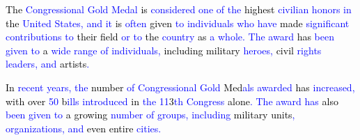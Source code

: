 \begin{tcolorbox}
    \textcolor{black}{The} \textcolor{blue}{Cong}\textcolor{blue}{r}\textcolor{blue}{essional} \textcolor{blue}{Gold} \textcolor{blue}{Medal} \textcolor{black}{is} \textcolor{blue}{considered} \textcolor{blue}{one} \textcolor{blue}{of} \textcolor{blue}{the} \textcolor{black}{highest} \textcolor{blue}{civil}\textcolor{blue}{ian} \textcolor{blue}{hon}\textcolor{blue}{ors} \textcolor{blue}{in} \textcolor{black}{the} \textcolor{blue}{United} \textcolor{blue}{States}\textcolor{blue}{,} \textcolor{blue}{and} \textcolor{blue}{it} \textcolor{black}{is} \textcolor{blue}{often} \textcolor{black}{given} \textcolor{blue}{to} \textcolor{blue}{individuals} \textcolor{blue}{who} \textcolor{blue}{have} \textcolor{black}{made} \textcolor{blue}{significant} \textcolor{blue}{contributions} \textcolor{blue}{to} \textcolor{black}{their} \textcolor{black}{field} \textcolor{blue}{or} \textcolor{blue}{to} \textcolor{black}{the} \textcolor{blue}{country} \textcolor{black}{as} \textcolor{blue}{a} \textcolor{blue}{whole}\textcolor{blue}{.} \textcolor{blue}{The} \textcolor{blue}{award} \textcolor{black}{has} \textcolor{blue}{been} \textcolor{blue}{given} \textcolor{blue}{to} \textcolor{black}{a} \textcolor{blue}{wide} \textcolor{blue}{range} \textcolor{blue}{of} \textcolor{blue}{individuals}\textcolor{blue}{,} \textcolor{black}{including} \textcolor{black}{military} \textcolor{blue}{hero}\textcolor{blue}{es}\textcolor{blue}{,} \textcolor{black}{civil} \textcolor{blue}{rights} \textcolor{blue}{leaders}\textcolor{blue}{,} \textcolor{blue}{and} \textcolor{black}{artists}\textcolor{blue}{.}
    
    \textcolor{black}{In} \textcolor{blue}{recent} \textcolor{blue}{years}\textcolor{blue}{,} \textcolor{blue}{the} \textcolor{black}{number} \textcolor{blue}{of} \textcolor{blue}{Cong}\textcolor{blue}{r}\textcolor{blue}{essional} \textcolor{blue}{Gold} \textcolor{black}{Med}\textcolor{blue}{als} \textcolor{blue}{awarded} \textcolor{black}{has} \textcolor{blue}{increased}\textcolor{blue}{,} \textcolor{black}{with} \textcolor{black}{over} \textcolor{blue}{}\textcolor{blue}{5}\textcolor{blue}{0} \textcolor{black}{b}\textcolor{blue}{ills} \textcolor{blue}{introduced} \textcolor{black}{in} \textcolor{blue}{the} \textcolor{blue}{}\textcolor{blue}{1}\textcolor{blue}{1}\textcolor{black}{3}\textcolor{blue}{th} \textcolor{blue}{Congress} \textcolor{black}{alone}\textcolor{blue}{.} \textcolor{blue}{The} \textcolor{blue}{award} \textcolor{blue}{has} \textcolor{black}{also} \textcolor{blue}{been} \textcolor{blue}{given} \textcolor{blue}{to} \textcolor{black}{a} \textcolor{black}{growing} \textcolor{blue}{number} \textcolor{blue}{of} \textcolor{blue}{groups}\textcolor{blue}{,} \textcolor{blue}{including} \textcolor{black}{military} \textcolor{black}{units}\textcolor{blue}{,} \textcolor{blue}{organizations}\textcolor{blue}{,} \textcolor{blue}{and} \textcolor{black}{even} \textcolor{black}{entire} \textcolor{blue}{cities}\textcolor{blue}{.}
    

\end{tcolorbox}
